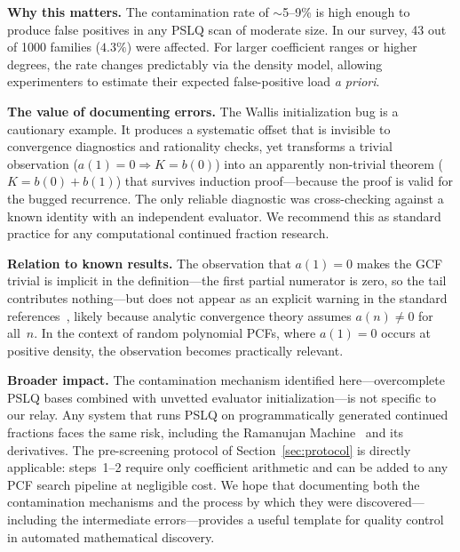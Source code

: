 \documentclass[11pt]{amsart}
\theoremstyle{definition}
\theoremstyle{remark}
\begin{document}
\textbf{Why this matters.}
The contamination rate of $\sim$5--9\% is high enough to produce
false positives in any PSLQ scan of moderate size.
In our survey, 43 out of 1000 families ($4.3\%$) were affected.
For larger coefficient ranges or higher degrees, the rate changes
predictably via the density model, allowing experimenters to
estimate their expected false-positive load \emph{a priori}.

\textbf{The value of documenting errors.}
The Wallis initialization bug is a cautionary example.
It produces a systematic offset that is invisible to convergence
diagnostics and rationality checks, yet transforms a trivial
observation ($a(1)=0 \Rightarrow K=b(0)$) into an apparently
non-trivial theorem ($K=b(0)+b(1)$) that survives induction
proof---because the proof is valid for the bugged recurrence.
The only reliable diagnostic was cross-checking against a known
identity with an independent evaluator.
We recommend this as standard practice for any computational
continued fraction research.

\textbf{Relation to known results.}
The observation that $a(1)=0$ makes the GCF trivial is implicit
in the definition---the first partial numerator is zero, so the
tail contributes nothing---but does not appear as an explicit
warning in the standard references~\cite{lorentzen-waadeland},
likely because analytic convergence theory assumes $a(n)\ne 0$
for all~$n$.
In the context of random polynomial PCFs, where $a(1)=0$ occurs
at positive density, the observation becomes practically relevant.

\textbf{Broader impact.}
The contamination mechanism identified here---overcomplete PSLQ bases
combined with unvetted evaluator initialization---is not specific to
our relay.
Any system that runs PSLQ on programmatically generated continued
fractions faces the same risk, including the Ramanujan
Machine~\cite{raayoni2021} and its derivatives.
The pre-screening protocol of Section~\ref{sec:protocol} is directly
applicable: steps~1--2 require only coefficient arithmetic and can
be added to any PCF search pipeline at negligible cost.
We hope that documenting both the contamination mechanisms and the
process by which they were discovered---including the intermediate
errors---provides a useful template for quality control in
automated mathematical discovery.
\end{document}

